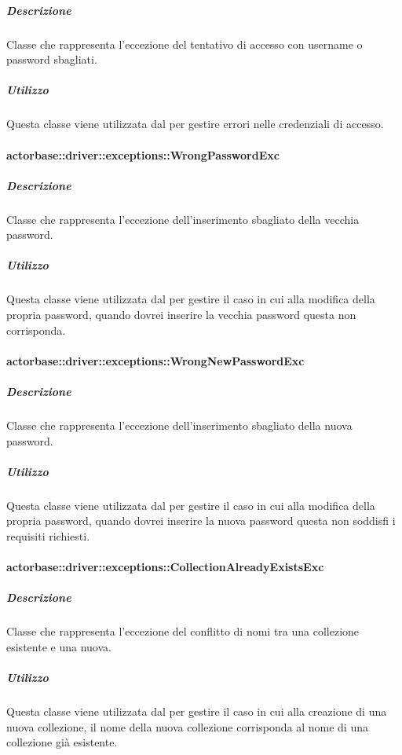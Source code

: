 \documentclass{scalatekids-article}
\begin{document}
\subparagraph{Descrizione}

Classe che rappresenta l'eccezione del tentativo di accesso con username o password sbagliati.

\subparagraph{Utilizzo}

Questa classe viene utilizzata dal  per gestire errori nelle credenziali di accesso.


\paragraph{actorbase::driver::exceptions::WrongPasswordExc}

\subparagraph{Descrizione}

Classe che rappresenta l'eccezione dell'inserimento sbagliato della vecchia password.

\subparagraph{Utilizzo}

Questa classe viene utilizzata dal  per gestire il caso in cui alla modifica della propria password, quando dovrei inserire la vecchia password questa non corrisponda.

\paragraph{actorbase::driver::exceptions::WrongNewPasswordExc}

\subparagraph{Descrizione}

Classe che rappresenta l'eccezione dell'inserimento sbagliato della nuova password.

\subparagraph{Utilizzo}

Questa classe viene utilizzata dal  per gestire il caso in cui alla modifica della propria password, quando dovrei inserire la nuova password questa non soddisfi i requisiti richiesti.

\paragraph{actorbase::driver::exceptions::CollectionAlreadyExistsExc}

\subparagraph{Descrizione}

Classe che rappresenta l'eccezione del conflitto di nomi tra una collezione esistente e una nuova.

\subparagraph{Utilizzo}

Questa classe viene utilizzata dal  per gestire il caso in cui alla creazione di una nuova collezione, il nome della nuova collezione corrisponda al nome di una collezione già esistente.
\end{document}
